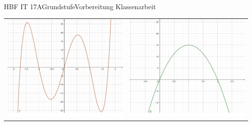 \documentclass[oneside,openany,headings=optiontotoc,11pt,numbers=noenddot]{scrreprt}
\begin{document}
\begin{worksheet}{HBF IT 17A}{Grundstufe}{Vorbereitung Klassenarbeit}
\begin{framed}
\begin{tabularx}{\textwidth}{X|X}
				\includegraphics[scale=0.25]{Bilder/KAUebungBilder/d2.png} & \includegraphics[scale=0.25]{Bilder/KAUebungBilder/e2.png} \\
			\end{tabularx}
			\begin{tabularx}{\textwidth}{X|X}

\end{tabularx}
\end{framed}
\end{worksheet}
\end{document}
